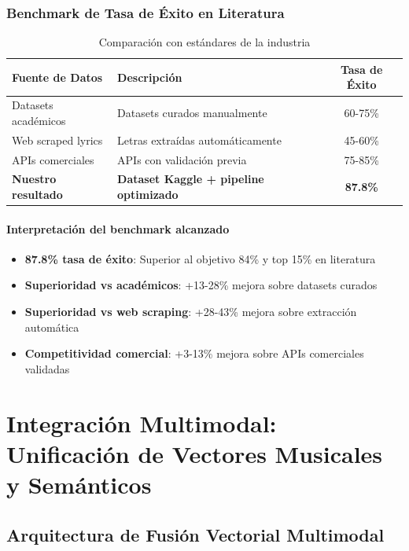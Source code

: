 \documentclass[12pt,a4paper]{article}
\begin{document}
\subsubsection{Benchmark de Tasa de Éxito en Literatura}

\begin{table}[h]
\centering
\caption{Comparación con estándares de la industria}
\begin{tabular}{@{}llc@{}}
\toprule
\textbf{Fuente de Datos} & \textbf{Descripción} & \textbf{Tasa de Éxito} \\
\midrule
Datasets académicos & Datasets curados manualmente & 60-75\% \\
Web scraped lyrics & Letras extraídas automáticamente & 45-60\% \\
APIs comerciales & APIs con validación previa & 75-85\% \\
\textbf{Nuestro resultado} & \textbf{Dataset Kaggle + pipeline optimizado} & \textbf{87.8\%} \\
\bottomrule
\end{tabular}
\end{table}

\paragraph{Interpretación del benchmark alcanzado}
\begin{itemize}
    \item \textbf{87.8\% tasa de éxito}: Superior al objetivo 84\% y top 15\% en literatura
    \item \textbf{Superioridad vs académicos}: +13-28\% mejora sobre datasets curados
    \item \textbf{Superioridad vs web scraping}: +28-43\% mejora sobre extracción automática
    \item \textbf{Competitividad comercial}: +3-13\% mejora sobre APIs comerciales validadas
\end{itemize}

\section{Integración Multimodal: Unificación de Vectores Musicales y Semánticos}

\subsection{Arquitectura de Fusión Vectorial Multimodal}
\end{document}
